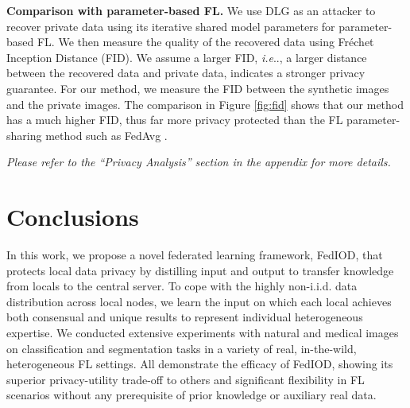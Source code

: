 \documentclass[letterpaper]{article} %
\makeatletter
\DeclareRobustCommand\onedot{\futurelet\@let@token\@onedot}
\def\@onedot{\ifx\@let@token.\else.\null\fi\xspace}
\def\ie{\emph{i.e}\onedot} \def\Ie{\emph{I.e}\onedot}
\makeatother
\begin{document}
 \textbf{Comparison with parameter-based FL.} 
We use DLG \cite{zhu2019deep} as an attacker to recover private data using its iterative shared model parameters for parameter-based FL. We then measure the quality of the recovered data using Fréchet Inception Distance (FID). 
We assume a larger FID, \ie, a larger distance between the recovered data and private data, indicates a stronger privacy guarantee. For our method, we measure the FID between the synthetic images and the private images. The comparison in Figure \ref{fig:fid} shows that our method has a much higher FID, thus far more privacy protected than the FL parameter-sharing method such as FedAvg \cite{mcmahan2017communication}.  

\textit{Please refer to the ``Privacy Analysis'' section in the appendix for more details.}

\section{Conclusions}
In this work, we propose a novel federated learning framework, FedIOD, that protects local data privacy by distilling input and output to transfer knowledge from locals to the central server. To cope with the highly non-i.i.d. data distribution across local nodes, we learn the input on which each local achieves both consensual and unique results to represent individual heterogeneous expertise.  
We conducted extensive experiments with natural and medical images on classification and segmentation tasks in a variety of real, in-the-wild, heterogeneous FL settings.
All demonstrate the efficacy of FedIOD, showing its superior privacy-utility trade-off to others and significant flexibility in FL scenarios without any prerequisite of prior knowledge or auxiliary real data.
\end{document}
